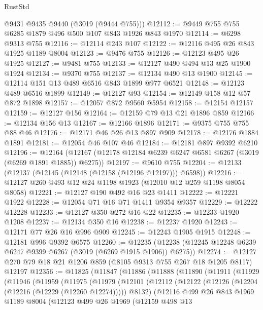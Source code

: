 \begin{lexlean}{RustStd}
\begin{coremodule}
      @9431
      @9435
      @9440
      (@3019 (@9444 @755)))
@12112 := @9449 @755 @755 @6285 @1879 @496 @500 @107 @843 @1926 @843 @1970
@12114 := @6298 @9313 @755
@12116 := @12114 @243 @107
@12122 := @12116 @495 @26 @843 @1925 @1189 @8004
@12123 := @9476 @755
@12126 := @12123 @495 @26 @1925
@12127 := @9481 @755
@12133 := @12127 @490 @494 @13 @25 @1900 @1924
@12134 := @9370 @755
@12137 := @12134 @490 @13 @1900
@12145 := @12114 @151 @13 @489 @6516 @843 @1899 @977 @6521
@12148 := @12123 @489 @6516 @1899
@12149 := @12127 @93
@12154 := @12149 @158 @12 @57 @872 @1898
@12157 := @12057 @872 @9560 @5954
@12158 := @12154 @12157
@12159 := @12127 @156
@12164 := @12159 @79 @13 @21 @1896 @859
@12166 := @12134 @156 @13
@12167 := @12166 @1896
@12171 := @9375 @755 @755 @88 @46
@12176 := @12171 @46 @26 @13 @897 @909
@12178 := @12176 @1884 @1891
@12181 := @12054 @46 @107 @46
@12184 := @12181 @897 @9392 @6210
@12196 := @12164 (@12167 (@12178 @12184 @6239 @6247 @6581 @6267 (@3019 (@6269 @1891 @1885)) @6275))
@12197 := @9610 @755
@12204 := @12133 (@12137 (@12145 (@12148 (@12158 (@12196 @12197))) @6598))
@12216 := @12127 @260 @493 @12 @24 @1198 @1923 (@12010 @12 @259 @1198 @8054 @8058)
@12221 := @12127 @190 @492 @16 @23 @1411
@12222 := @12221 @1922
@12228 := @12054 @71 @16 @71 @1411 @9354 @9357
@12229 := @12222 @12228
@12233 := @12127 @350 @272 @16 @22
@12235 := @12233 @1920 @1208
@12237 := @12134 @350 @16
@12238 := @12237 @1920
@12243 := @12171 @77 @26 @16 @996 @909
@12245 := @12243 @1905 @1915
@12248 := @12181 @996 @9392 @6575
@12260 := @12235 (@12238 (@12245 @12248 @6239 @6247 @9399 @6267 (@3019 (@6269 @1915 @1906)) @6275))
@12274 := @12127 @270 @79 @18 @21 @1206 @859 (@8105 @9313 @755 @267 @18 @1205 @8117) @12197
@12356 := @11825
    (@11847
      (@11886
        (@11888
          (@11890
            (@11911
              (@11929
                (@11946
                  (@11959
                    (@11975
                      (@11979
                        (@12101
                          (@12112
                            (@12122 (@12126 (@12204 (@12216 (@12229 (@12260 @12274))))) @8132)
                            (@12116
                              @499
                              @26
                              @843
                              @1969
                              @1189
                              @8004
                              (@12123
                                @499
                                @26
                                @1969
                                (@12159
                                  @498
                                  @13

\end{coremodule}
\end{lexlean}
